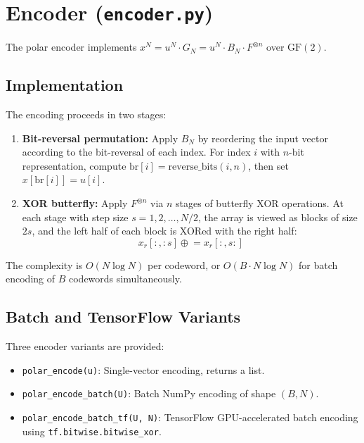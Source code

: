 \documentclass[11pt,a4paper]{article}
\newcommand{\GF}{\mathrm{GF}}
\begin{document}
\section{Encoder (\texttt{encoder.py})}
\label{sec:encoder}

The polar encoder implements $x^N = u^N \cdot G_N = u^N \cdot B_N \cdot F^{\otimes n}$ over $\GF(2)$.

\subsection{Implementation}

The encoding proceeds in two stages:
\begin{enumerate}
  \item \textbf{Bit-reversal permutation:} Apply $B_N$ by reordering the input vector according to the bit-reversal of each index. For index $i$ with $n$-bit representation, compute $\text{br}[i] = \text{reverse\_bits}(i, n)$, then set $x[\text{br}[i]] = u[i]$.

  \item \textbf{XOR butterfly:} Apply $F^{\otimes n}$ via $n$ stages of butterfly XOR operations. At each stage with step size $s = 1, 2, \ldots, N/2$, the array is viewed as blocks of size $2s$, and the left half of each block is XORed with the right half:
  \begin{equation}
    x_r[:, :s] \mathrel{\oplus}= x_r[:, s:]
  \end{equation}
\end{enumerate}

The complexity is $O(N \log N)$ per codeword, or $O(B \cdot N \log N)$ for batch encoding of $B$ codewords simultaneously.

\subsection{Batch and TensorFlow Variants}

Three encoder variants are provided:
\begin{itemize}
  \item \texttt{polar\_encode(u)}: Single-vector encoding, returns a list.
  \item \texttt{polar\_encode\_batch(U)}: Batch NumPy encoding of shape $(B, N)$.
  \item \texttt{polar\_encode\_batch\_tf(U, N)}: TensorFlow GPU-accelerated batch encoding using \texttt{tf.bitwise.bitwise\_xor}.
\end{itemize}
\end{document}
